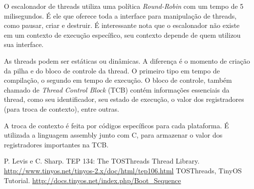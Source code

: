 \documentclass[a4paper,onecolumn, 10pt]{article}
\begin{document}
O escalonador de threads utiliza uma política \textit{Round-Robin} com um tempo de 5 milisegundos. É ele que oferece
toda a interface para manipulação de threads, como pausar, criar e destruir. É interessante nota que o escalonador não
existe em um contexto de execução específico, seu contexto depende de quem utilizou sua interface.

As threads podem ser estáticas ou dinâmicas. A diferença é o momento de criação da pilha e do bloco de controle da
thread. O primeiro tipo em tempo de compilação, o segundo em tempo de execução. O bloco de controle, também chamado de
\textit{Thread Control Block} (TCB) contém informações essenciais da thread, como seu identificador, seu estado de
execução, o valor dos registradores (para troca de contexto), entre outras.

A troca de contexto é feita por códigos específicos para cada plataforma. É utilizada a linguagem assembly junto com C,
para armazenar o valor dos registradores importantes na TCB.

\pagebreak

\begin{thebibliography}{9}
 P. Levis e C. Sharp. TEP 134: The TOSThreads Thread Library.
                    \url{http://www.tinyos.net/tinyos-2.x/doc/html/tep106.html}
 TOSThreads, TinyOS Tutorial. \url{http://docs.tinyos.net/index.php/Boot_Sequence}
\end{thebibliography}
\end{document}
